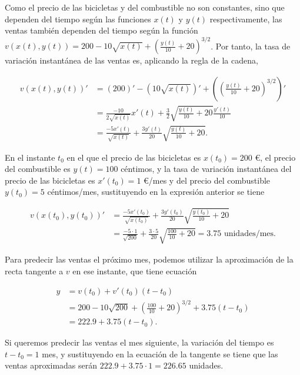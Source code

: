\documentclass[
  spanish,
  a4paper,
]{scrreport}
\theoremstyle{definition}
\theoremstyle{remark}
\begin{document}
\begin{tcolorbox}[enhanced jigsaw, arc=.35mm, bottomrule=.15mm, bottomtitle=1mm, breakable, colback=white, colbacktitle=quarto-callout-tip-color!10!white, colframe=quarto-callout-tip-color-frame, coltitle=black, left=2mm, leftrule=.75mm, opacityback=0, opacitybacktitle=0.6, rightrule=.15mm, title=\textcolor{quarto-callout-tip-color}{\faLightbulb}\hspace{0.5em}{Solución}, titlerule=0mm, toprule=.15mm, toptitle=1mm]

Como el precio de las bicicletas y del combustible no son constantes,
sino que dependen del tiempo según las funciones \(x(t)\) y \(y(t)\)
respectivamente, las ventas también dependen del tiempo según la función
\(v(x(t),y(t))=200-10\sqrt{x(t)}+(\frac{y(t)}{10}+20)^{3/2}\). Por
tanto, la tasa de variación instantánea de las ventas es, aplicando la
regla de la cadena,

\begin{align*}
v(x(t),y(t))' &= (200)'-\left(10\sqrt{x(t)}\right)'+\left(\left(\frac{y(t)}{10}+20\right)^{3/2}\right)'\\ 
&= \frac{-10}{2\sqrt{x(t)}}x'(t) + \frac{3}{2}\sqrt{\frac{y(t)}{10}+20}\frac{y'(t)}{10} \\
&= \frac{-5x'(t)}{\sqrt{x(t)}} + \frac{3y'(t)}{20}\sqrt{\frac{y(t)}{10}+20}.
\end{align*}

En el instante \(t_0\) en el que el precio de las bicicletas es
\(x(t_0)=200\) €, el precio del combustible es \(y(t) = 100\) céntimos,
y la tasa de variación instantánea del precio de las bicicletas es
\(x'(t_0)=1\) €/mes y del precio del combustible \(y(t_0)=5\)
céntimos/mes, sustituyendo en la expresión anterior se tiene

\begin{align*}
v(x(t_0),y(t_0))' &= \frac{-5x'(t_0)}{\sqrt{x(t_0)}} + \frac{3y'(t_0)}{20}\sqrt{\frac{y(t_0)}{10}+20}\\ 
& = \frac{-5\cdot 1}{\sqrt{200}} + \frac{3\cdot 5}{20}\sqrt{\frac{100}{10}+20} = 3.75 \mbox{ unidades/mes}.
\end{align*}

Para predecir las ventas el próximo mes, podemos utilizar la
aproximación de la recta tangente a \(v\) en ese instante, que tiene
ecuación

\begin{align*}
y &= v(t_0) + v'(t_0) (t-t_0) \\ 
&= 200-10\sqrt{200}+(\frac{100}{10}+20)^{3/2} + 3.75 (t-t_0) \\ 
&= 222.9 + 3.75 (t-t_0).
\end{align*}

Si queremos predecir las ventas el mes siguiente, la variación del
tiempo es \(t-t_0=1\) mes, y sustituyendo en la ecuación de la tangente
se tiene que las ventas aproximadas serán \(222.9+3.75\cdot 1 = 226.65\)
unidades.

\end{tcolorbox}
\end{document}
